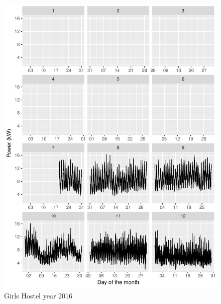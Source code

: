 \documentclass[11pt, oneside]{article}   	%
\begin{document}
\begin{figure}
\includegraphics[keepaspectratio]{girls_hostel_year2016.pdf}
\caption{Girls Hostel year 2016}
\end{figure}
\end{document}
